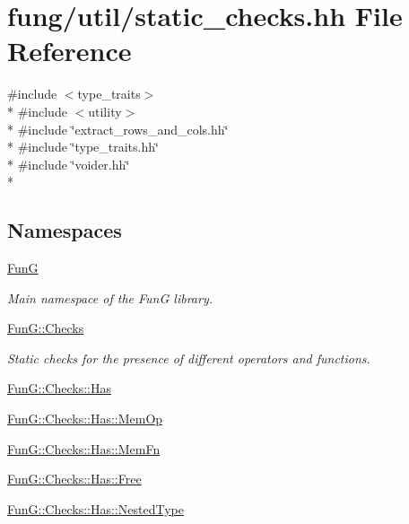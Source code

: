 \hypertarget{static__checks_8hh}{}\section{fung/util/static\+\_\+checks.hh File Reference}
\label{static__checks_8hh}
{\ttfamily \#include $<$type\+\_\+traits$>$}\\*
{\ttfamily \#include $<$utility$>$}\\*
{\ttfamily \#include \char`\"{}extract\+\_\+rows\+\_\+and\+\_\+cols.\+hh\char`\"{}}\\*
{\ttfamily \#include \char`\"{}type\+\_\+traits.\+hh\char`\"{}}\\*
{\ttfamily \#include \char`\"{}voider.\+hh\char`\"{}}\\*
\subsection*{Namespaces}
\begin{DoxyCompactItemize}
\item 
 \hyperlink{namespaceFunG}{FunG}
\begin{DoxyCompactList}\small\item\em Main namespace of the FunG library. \end{DoxyCompactList}\item 
 \hyperlink{namespaceFunG_1_1Checks}{Fun\+G\+::\+Checks}
\begin{DoxyCompactList}\small\item\em Static checks for the presence of different operators and functions. \end{DoxyCompactList}\item 
 \hyperlink{namespaceFunG_1_1Checks_1_1Has}{Fun\+G\+::\+Checks\+::\+Has}
\item 
 \hyperlink{namespaceFunG_1_1Checks_1_1Has_1_1MemOp}{Fun\+G\+::\+Checks\+::\+Has\+::\+Mem\+Op}
\item 
 \hyperlink{namespaceFunG_1_1Checks_1_1Has_1_1MemFn}{Fun\+G\+::\+Checks\+::\+Has\+::\+Mem\+Fn}
\item 
 \hyperlink{namespaceFunG_1_1Checks_1_1Has_1_1Free}{Fun\+G\+::\+Checks\+::\+Has\+::\+Free}
\item 
 \hyperlink{namespaceFunG_1_1Checks_1_1Has_1_1NestedType}{Fun\+G\+::\+Checks\+::\+Has\+::\+Nested\+Type}
\end{DoxyCompactItemize}
